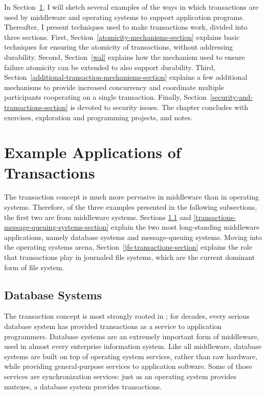 In Section~\ref{trasactions-examples-section}, I will sketch several examples of the ways in
which transactions are used by middleware and operating systems to
support application programs.  Thereafter, I present techniques used
to make transactions work, divided into three sections.  First, Section~\ref{atomicity-mechanisms-section}
explains basic techniques for ensuring the atomicity of transactions,
without addressing durability.  Second, Section~\ref{wal} explains how
the mechanism used to ensure failure atomicity can be extended to also
support durability.  Third,
Section~\ref{additional-transaction-mechanisms-section} explains a few additional mechanisms
to provide increased concurrency and
coordinate multiple participants cooperating on a single transaction.
Finally, Section~\ref{security-and-transactions-section} is devoted to security issues.
The chapter concludes with exercises, exploration and programming projects, and notes.

\section{Example Applications of Transactions}\label{trasactions-examples-section}

The transaction concept is much more pervasive in middleware than in
operating systems.  Therefore, of the three examples presented in the
following subsections, the first two are from middleware systems.
Sections \ref{db-transaction-section} and
\ref{transactions-message-queuing-systems-section} explain the two
most long-standing middleware applications, namely database systems
and message-queuing systems.
Moving into the operating systems arena, Section~\ref{jfs-transactions-section} 
explains the role that transactions play in
journaled file systems, which are the current dominant form of file
system.

\subsection{Database Systems}\label{db-transaction-section}

The transaction concept is most strongly rooted in ; for decades, every serious database system has provided
transactions as a service to application programmers.  Database
systems are an extremely important form of middleware, used in almost
every enterprise information system.  Like all middleware,
database systems are built on top of operating system services, rather
than raw hardware, while providing  general-purpose services
to application software.  Some of those services are synchronization
services: just as an operating system provides mutexes, a database
system provides transactions.

